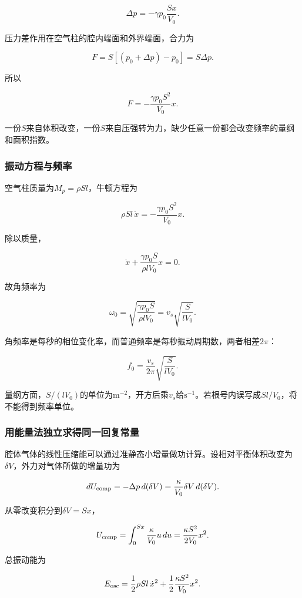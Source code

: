 \documentclass[12pt,a4paper,fontset=fandol]{ctexart}
\begin{document}
\[
\Delta p=-\gamma p_0\frac{Sx}{V_0}.
\]

压力差作用在空气柱的腔内端面和外界端面，合力为

\[
F=S[(p_0+\Delta p)-p_0]
=S\Delta p.
\]

所以

\[
\boxed{F=-\frac{\gamma p_0S^2}{V_0}x}.
\]

一份\(S\)来自体积改变，一份\(S\)来自压强转为力，缺少任意一份都会改变频率的量纲和面积指数。

\subsubsection{振动方程与频率}\label{ux632fux52a8ux65b9ux7a0bux4e0eux9891ux7387}

空气柱质量为\(M_p=\rho Sl\)，牛顿方程为

\[
\rho Sl\,\ddot x
=-\frac{\gamma p_0S^2}{V_0}x.
\]

除以质量，

\[
\ddot x+\frac{\gamma p_0S}{\rho lV_0}x=0.
\]

故角频率为

\[
\omega_0=
\sqrt{\frac{\gamma p_0S}{\rho lV_0}}
=v_s\sqrt{\frac{S}{lV_0}}.
\]

角频率是每秒的相位变化率，而普通频率是每秒振动周期数，两者相差\(2\pi\)：

\[
\boxed{f_0=\frac{v_s}{2\pi}
\sqrt{\frac{S}{lV_0}}}.
\]

量纲方面，\(S/(lV_0)\)的单位为\(\mathrm{m^{-2}}\)，开方后乘\(v_s\)给\(\mathrm{s^{-1}}\)。若根号内误写成\(Sl/V_0\)，将不能得到频率单位。

\subsubsection{用能量法独立求得同一回复常量}\label{ux7528ux80fdux91cfux6cd5ux72ecux7acbux6c42ux5f97ux540cux4e00ux56deux590dux5e38ux91cf}

腔体气体的线性压缩能可以通过准静态小增量做功计算。设相对平衡体积改变为\(\delta V\)，外力对气体所做的增量功为

\[
dU_{\rm comp}
=-\Delta p\,d(\delta V)
=\frac{\kappa}{V_0}\delta V\,d(\delta V).
\]

从零改变积分到\(\delta V=Sx\)，

\[
U_{\rm comp}=
\int_0^{Sx}\frac{\kappa}{V_0}u\,du
=\frac{\kappa S^2}{2V_0}x^2.
\]

总振动能为

\[
E_{\rm osc}
=\frac12\rho Sl\,\dot x^2
+\frac12\frac{\kappa S^2}{V_0}x^2.
\]
\end{document}
